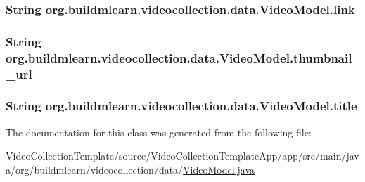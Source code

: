 \subsubsection[{\texorpdfstring{link}{link}}]{\setlength{\rightskip}{0pt plus 5cm}String org.\+buildmlearn.\+videocollection.\+data.\+Video\+Model.\+link\hspace{0.3cm}{\ttfamily [private]}}\hypertarget{classorg_1_1buildmlearn_1_1videocollection_1_1data_1_1VideoModel_acf994b6c064aa05c64e86bb6b74b6d64}{}\label{classorg_1_1buildmlearn_1_1videocollection_1_1data_1_1VideoModel_acf994b6c064aa05c64e86bb6b74b6d64}
\subsubsection[{\texorpdfstring{thumbnail\+\_\+url}{thumbnail_url}}]{\setlength{\rightskip}{0pt plus 5cm}String org.\+buildmlearn.\+videocollection.\+data.\+Video\+Model.\+thumbnail\+\_\+url\hspace{0.3cm}{\ttfamily [private]}}\hypertarget{classorg_1_1buildmlearn_1_1videocollection_1_1data_1_1VideoModel_ad793fdd9dc6317f284926a25a1906372}{}\label{classorg_1_1buildmlearn_1_1videocollection_1_1data_1_1VideoModel_ad793fdd9dc6317f284926a25a1906372}
\subsubsection[{\texorpdfstring{title}{title}}]{\setlength{\rightskip}{0pt plus 5cm}String org.\+buildmlearn.\+videocollection.\+data.\+Video\+Model.\+title\hspace{0.3cm}{\ttfamily [private]}}\hypertarget{classorg_1_1buildmlearn_1_1videocollection_1_1data_1_1VideoModel_a9167ad2db7e5f86d94b0a627d74a10b7}{}\label{classorg_1_1buildmlearn_1_1videocollection_1_1data_1_1VideoModel_a9167ad2db7e5f86d94b0a627d74a10b7}


The documentation for this class was generated from the following file\+:\begin{DoxyCompactItemize}
\item 
Video\+Collection\+Template/source/\+Video\+Collection\+Template\+App/app/src/main/java/org/buildmlearn/videocollection/data/\hyperlink{VideoModel_8java}{Video\+Model.\+java}\end{DoxyCompactItemize}
